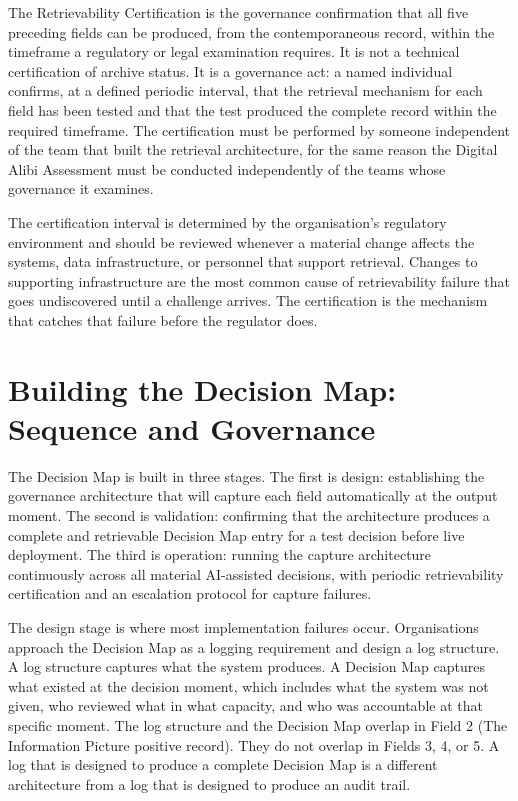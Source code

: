 The Retrievability Certification is the governance confirmation that all five preceding fields can be produced, from the contemporaneous record, within the timeframe a regulatory or legal examination requires. It is not a technical certification of archive status. It is a governance act: a named individual confirms, at a defined periodic interval, that the retrieval mechanism for each field has been tested and that the test produced the complete record within the required timeframe. The certification must be performed by someone independent of the team that built the retrieval architecture, for the same reason the Digital Alibi Assessment must be conducted independently of the teams whose governance it examines.

The certification interval is determined by the organisation's regulatory environment and should be reviewed whenever a material change affects the systems, data infrastructure, or personnel that support retrieval. Changes to supporting infrastructure are the most common cause of retrievability failure that goes undiscovered until a challenge arrives. The certification is the mechanism that catches that failure before the regulator does.

\scenebreak

\section{Building the Decision Map: Sequence and Governance}

The Decision Map is built in three stages. The first is design: establishing the governance architecture that will capture each field automatically at the output moment. The second is validation: confirming that the architecture produces a complete and retrievable Decision Map entry for a test decision before live deployment. The third is operation: running the capture architecture continuously across all material AI-assisted decisions, with periodic retrievability certification and an escalation protocol for capture failures.

The design stage is where most implementation failures occur. Organisations approach the Decision Map as a logging requirement and design a log structure. A log structure captures what the system produces. A Decision Map captures what existed at the decision moment, which includes what the system was not given, who reviewed what in what capacity, and who was accountable at that specific moment. The log structure and the Decision Map overlap in Field 2 (The Information Picture positive record). They do not overlap in Fields 3, 4, or 5. A log that is designed to produce a complete Decision Map is a different architecture from a log that is designed to produce an audit trail.

